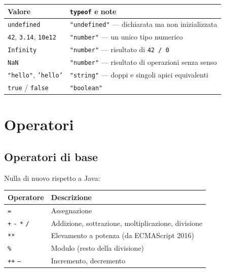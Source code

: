 \documentclass[10pt,a4paper]{article}
\begin{document}
\begin{center}
\small
\begin{tabularx}{\textwidth}{@{}lX@{}}
\toprule
\textbf{Valore} & \textbf{\texttt{typeof}} e note \\
\midrule
\texttt{undefined} & \texttt{"undefined"} --- dichiarata ma non inizializzata \\
\texttt{42}, \texttt{3.14}, \texttt{10e12} & \texttt{"number"} --- un unico tipo numerico \\
\texttt{Infinity} & \texttt{"number"} --- risultato di \texttt{42 / 0} \\
\texttt{NaN} & \texttt{"number"} --- risultato di operazioni senza senso \\
\texttt{"hello"}, \texttt{'hello'} & \texttt{"string"} --- doppi e singoli apici equivalenti \\
\texttt{true} / \texttt{false} & \texttt{"boolean"} \\
\bottomrule
\end{tabularx}
\end{center}

\section{Operatori}

\subsection{Operatori di base}

Nulla di nuovo rispetto a Java:

\begin{center}
\small
\begin{tabularx}{\textwidth}{@{}lX@{}}
\toprule
\textbf{Operatore} & \textbf{Descrizione} \\
\midrule
\texttt{=} & Assegnazione \\
\texttt{+} \texttt{-} \texttt{*} \texttt{/} & Addizione, sottrazione, moltiplicazione, divisione \\
\texttt{**} & Elevamento a potenza (da ECMAScript 2016) \\
\texttt{\%} & Modulo (resto della divisione) \\
\texttt{++} \texttt{--} & Incremento, decremento \\
\bottomrule
\end{tabularx}
\end{center}
\end{document}
